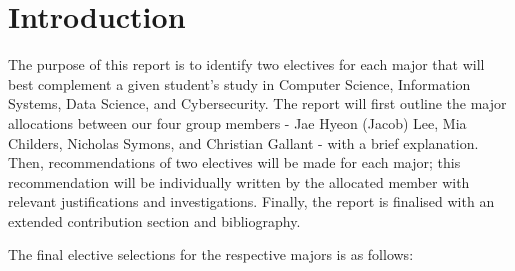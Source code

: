 \section{\textbf{Introduction}}

The purpose of this report is to identify two electives for each major that will best complement a given student’s study in Computer Science, Information Systems, Data Science, and Cybersecurity. The report will first outline the major allocations between our four group members - Jae Hyeon (Jacob) Lee, Mia Childers, Nicholas Symons, and Christian Gallant - with a brief explanation. Then, recommendations of two electives will be made for each major; this recommendation will be individually written by the allocated member with relevant justifications and investigations. Finally, the report is finalised with an extended contribution section and bibliography. 

The final elective selections for the respective majors is as follows: